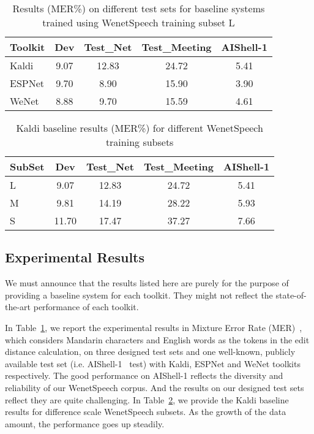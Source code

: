 \documentclass{article}
\begin{document}
\vspace{-15pt}
\begin{table}[ht]
\caption{Results (MER\%) on different test sets for baseline systems trained using WenetSpeech training subset L}
\label{tab5:all_baselines}
\centering
\begin{tabular}{@{}lcccc@{}}
\toprule[2pt]
Toolkit & Dev & Test\_Net & Test\_Meeting & AIShell-1 \\
\midrule[1pt]
Kaldi & 9.07 & 12.83 & 24.72 & 5.41 \\
ESPNet & 9.70 & 8.90 & 15.90 & 3.90 \\
WeNet & 8.88 & 9.70 & 15.59 & 4.61 \\
\bottomrule[2pt]
\end{tabular}
\vspace{-10pt}
\end{table}

\vspace{-15pt}
\begin{table}[ht]
\caption{Kaldi baseline results  (MER\%) for different WenetSpeech training subsets}
\label{tab6:kaldi_baselines}
\centering
\begin{tabular}{@{}lcccc@{}}
\toprule[2pt]
SubSet & Dev & Test\_Net & Test\_Meeting & AIShell-1 \\
\midrule[1pt]
L & 9.07 & 12.83 & 24.72 & 5.41 \\
M & 9.81 & 14.19 & 28.22 & 5.93 \\
S & 11.70 & 17.47 & 37.27 & 7.66 \\
\bottomrule[2pt]
\end{tabular}
\vspace{-10pt}
\end{table}

\vspace{-1em}
\subsection {Experimental Results}
\vspace{-0.5em}
We must announce that the results listed here are purely for the purpose of providing a baseline system for each toolkit. They might not reflect the state-of-the-art performance of each toolkit.

In Table~\ref{tab5:all_baselines}, we report the experimental results in Mixture Error Rate (MER)~\cite{shi2020asru}, which considers Mandarin characters and English words as the tokens in the edit distance calculation, on three designed test sets and one well-known, publicly available test set (i.e. AIShell-1~\cite{bu2017aishell} test) with Kaldi, ESPNet and WeNet toolkits respectively. The good performance on AIShell-1 reflects the diversity and reliability of our WenetSpeech corpus. And the results on our designed test sets reflect they are quite challenging. In Table~\ref{tab6:kaldi_baselines}, we provide the Kaldi baseline results for difference scale WenetSpeech subsets. As the growth of the data amount, the performance goes up steadily. 
\end{document}

